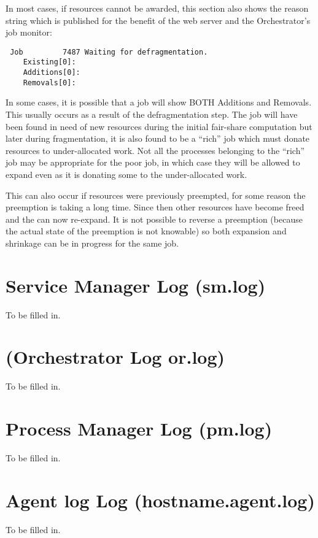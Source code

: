       In most cases, if resources cannot be awarded, this section also shows the reason 
      string which is published for the benefit of the web server and the Orchestrator's job monitor:
\begin{verbatim}
 Job         7487 Waiting for defragmentation.
	Existing[0]: 
	Additions[0]: 
	Removals[0]: 
\end{verbatim}

     In some cases, it is possible that a job will show BOTH Additions and Removals.  This usually
     occurs as a result of the defragmentation step.  The job will have been found in need of
     new resources during the initial fair-share computation but later during fragmentation,
     it is also found to be a ``rich'' job which must donate resources to under-allocated work.
     Not all the processes belonging to the ``rich'' job may be appropriate for the poor job,
     in which case they will be allowed to expand even as it is donating some to the
     under-allocated work.

     This can also occur if resources were previously preempted, for some reason the
     preemption is taking a long time.  Since then other resources have become freed and
     the can now re-expand.  It is not possible to reverse a preemption (because the actual
     state of the preemption is not knowable) so both expansion and shrinkage can be
     in progress for the same job.

\section{Service  Manager Log (sm.log)}
    To be filled in.

\section{ (Orchestrator Log or.log)}
    To be filled in.

\section{Process Manager Log (pm.log)}
    To be filled in.

\section{Agent log Log (hostname.agent.log)}
    To be filled in.
